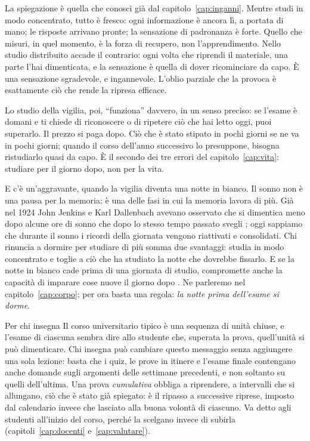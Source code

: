 La spiegazione è quella che conosci già dal
capitolo~\ref{cap:inganni}. Mentre studi in modo concentrato, tutto è
fresco: ogni informazione è ancora lì, a portata di mano; le risposte
arrivano pronte; la sensazione di padronanza è forte. Quello che
misuri, in quel momento, è la forza di recupero, non l'apprendimento.
Nello studio distribuito accade il contrario: ogni volta che riprendi
il materiale, una parte l'hai dimenticata, e la sensazione è quella di
dover ricominciare da capo. È una sensazione sgradevole, e ingannevole.
L'oblio parziale che la provoca è esattamente ciò che rende la ripresa
efficace.

Lo studio della vigilia, poi, \enquote{funziona} davvero, in un senso
preciso: se l'esame è domani e ti chiede di riconoscere o di ripetere
ciò che hai letto oggi, puoi superarlo. Il prezzo si paga dopo. Ciò
che è stato stipato in pochi giorni se ne va in pochi giorni; quando il
corso dell'anno successivo lo presuppone, bisogna ristudiarlo quasi da
capo. È il secondo dei tre errori del capitolo~\ref{cap:vita}:
studiare per il giorno dopo, non per la vita.

E c'è un'aggravante, quando la vigilia diventa una notte in bianco.
Il sonno non è una pausa per la memoria: è una delle fasi in cui la
memoria lavora di più. Già nel 1924 John Jenkins e Karl Dallenbach
avevano osservato che si dimentica meno dopo alcune ore di sonno che
dopo lo stesso tempo passato svegli \parencite{jenkins1924}; oggi
sappiamo che durante il sonno i ricordi della giornata vengono
riattivati e consolidati. Chi rinuncia a dormire per studiare di più
somma due svantaggi: studia in modo concentrato e toglie a ciò che ha
studiato la notte che dovrebbe fissarlo. E se la notte in bianco cade
prima di una giornata di studio, compromette anche la capacità di
imparare cose nuove il giorno dopo \parencite{yoo2007}. Ne parleremo nel
capitolo~\ref{cap:corpo}; per ora basta una regola: \emph{la notte
prima dell'esame si dorme}.

\begin{riquadro}{Per chi insegna}
Il corso universitario tipico è una sequenza di unità chiuse, e
l'esame di ciascuna sembra dire allo studente che, superata la prova,
quell'unità si può dimenticare. Chi insegna può cambiare questo
messaggio senza aggiungere una sola lezione: basta che i quiz, le
prove in itinere e l'esame finale contengano anche domande sugli
argomenti delle settimane precedenti, e non soltanto su quelli
dell'ultima. Una prova \emph{cumulativa} obbliga a riprendere, a
intervalli che si allungano, ciò che è stato già spiegato: è il
ripasso a successive riprese, imposto dal calendario invece che
lasciato alla buona volontà di ciascuno. Va detto agli studenti
all'inizio del corso, perché la scelgano invece di subirla
(capitoli~\ref{cap:docenti} e~\ref{cap:valutare}).
\end{riquadro}

